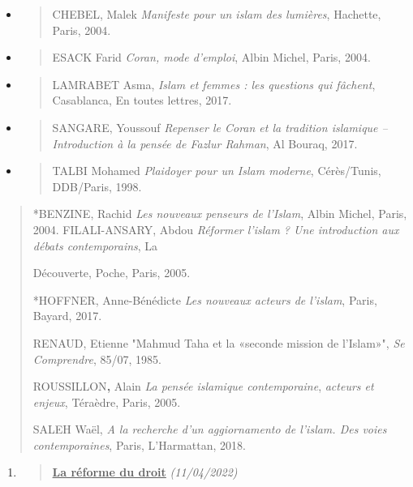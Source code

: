 \begin{itemize}
\item
  \begin{quote}
  CHEBEL, Malek \emph{Manifeste pour un islam des lumières}, Hachette,
  Paris, 2004.
  \end{quote}
\item
  \begin{quote}
  ESACK Farid \emph{Coran, mode d'emploi}, Albin Michel, Paris, 2004.
  \end{quote}
\item
  \begin{quote}
  LAMRABET Asma, \emph{Islam et femmes : les questions qui fâchent},
  Casablanca, En toutes lettres, 2017.
  \end{quote}
\item
  \begin{quote}
  SANGARE, Youssouf \emph{Repenser le Coran et la tradition islamique --
  Introduction à la pensée de Fazlur Rahman}, Al Bouraq, 2017.
  \end{quote}
\item
  \begin{quote}
  TALBI Mohamed \emph{Plaidoyer pour un Islam moderne}, Cérès/Tunis,
  DDB/Paris, 1998.
  \end{quote}
\end{itemize}

\begin{quote}
*BENZINE, Rachid \emph{Les nouveaux penseurs de l'Islam}, Albin Michel,
Paris, 2004. FILALI-ANSARY, Abdou \emph{Réformer l'islam ? Une
introduction aux débats contemporains}, La

Découverte, Poche, Paris, 2005.

*HOFFNER, Anne-Bénédicte \emph{Les nouveaux acteurs de l'islam}, Paris,
Bayard, 2017.

RENAUD, Etienne "Mahmud Taha et la «seconde mission de l'Islam»",
\emph{Se Comprendre}, 85/07, 1985.

ROUSSILLON\textbf{,} Alain \emph{La pensée islamique contemporaine},
\emph{acteurs et enjeux}, Téraèdre, Paris, 2005.

SALEH Waël, \emph{A la recherche d'un aggiornamento de l'islam. Des
voies contemporaines}, Paris, L'Harmattan, 2018.
\end{quote}

\begin{enumerate}
\def\labelenumi{\arabic{enumi}.}
\setcounter{enumi}{1}
\item
  \begin{quote}
  \textbf{\underline{La réforme du droit}} \emph{(11/04/2022)}
  \end{quote}
\end{enumerate}

